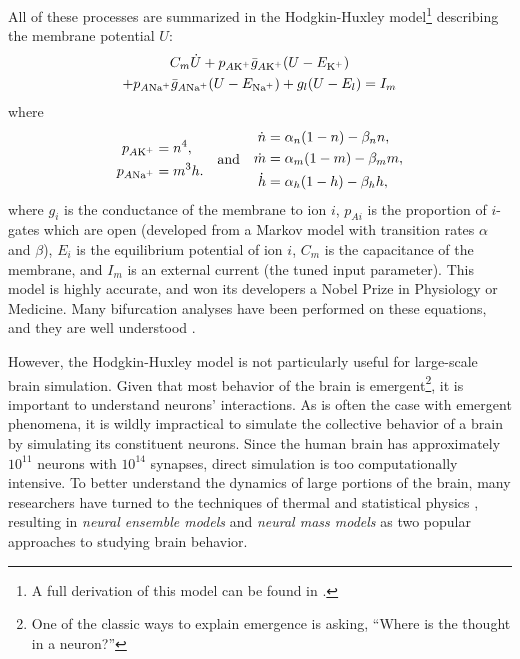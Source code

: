 All of these processes are summarized in the Hodgkin-Huxley model\footnote{A full derivation of this model can be found in \cite{Graben2008}.} describing the membrane potential $U$:
\begin{multline}
  \label{eq:hodgkin_huxley_main}
  C_{m} \dot{U}
  +
  p_{A \ce{K^{+}}} \mean{g}_{A \ce{K^{+}}} \pqty{U - E_{\ce{K^{+}}}} \\
  +
  p_{A \ce{Na^{+}}} \mean{g}_{A \ce{Na^{+}}} \pqty{U - E_{\ce{Na^{+}}}}
  +
  g_{l} \pqty{U - E_{l}}
  =
  I_{m}
\end{multline}
where
\begin{equation}
  \label{eq:hodgkin_huxley_supplementary}
  \begin{aligned}
    p_{A \ce{K^{+}}}
    &=
    n^{4}, \\
    p_{A \ce{Na^{+}}}
    &=
    m^{3} h.
  \end{aligned}
  \qand
  \begin{aligned}
    \dot{n}
    &=
    \alpha_{n} \pqty{1 - n} - \beta_{n} n, \\
    \dot{m}
    &=
    \alpha_{m} \pqty{1 - m} - \beta_{m} m, \\
    \dot{h}
    &=
    \alpha_{h} \pqty{1 - h} - \beta_{h} h,
  \end{aligned}
\end{equation}
where $g_{i}$ is the conductance of the membrane to ion $i$, $p_{A i}$ is the proportion of $i$-gates which are open (developed from a Markov model with transition rates $\alpha$ and $\beta$), $E_{i}$ is the equilibrium potential of ion $i$, $C_{m}$ is the capacitance of the membrane, and $I_{m}$ is an external current (the tuned input parameter).
This model is highly accurate, and won its developers a Nobel Prize in Physiology or Medicine.
Many bifurcation analyses have been performed on these equations, and they are well understood \cite{Graben2008}.

However, the Hodgkin-Huxley model is not particularly useful for large-scale brain simulation.
Given that most behavior of the brain is emergent\footnote{One of the classic ways to explain emergence is asking, ``Where is the thought in a neuron?''}, it is important to understand neurons' interactions.
As is often the case with emergent phenomena, it is wildly impractical to simulate the collective behavior of a brain by simulating its constituent neurons.
Since the human brain has approximately $10^{11}$ neurons with $10^{14}$ synapses, direct simulation is too computationally intensive.
To better understand the dynamics of large portions of the brain, many researchers have turned to the techniques of thermal and statistical physics \cite{Breakspear2017},
resulting in \textit{neural ensemble models} and \textit{neural mass models} as two popular approaches to studying brain behavior.

